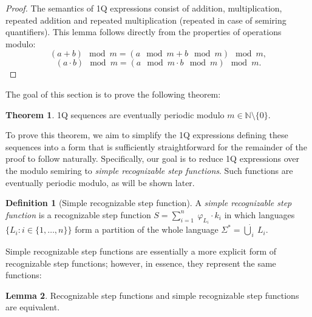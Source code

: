 \documentclass[12pt]{article}
\theoremstyle{definition}
\newtheorem{definition}{Definition}[section]
\newtheorem{theorem}{Theorem}[section]
\newtheorem{lemma}[theorem]{Lemma}
\begin{document}
\begin{proof}
    The semantics of 1Q expressions consist of addition, multiplication, repeated addition and repeated multiplication (repeated in case of semiring quantifiers). This lemma follows directly from the properties of operations modulo:
    $$(a + b) \mod m = (a \mod m + b \mod m) \mod m,$$
    $$(a \cdot b) \mod m = (a \mod m \cdot b \mod m) \mod m.$$
\end{proof}

The goal of this section is to prove the following theorem:

\begin{theorem}
    \label{1QSequencesPeriodic}
    1Q sequences are eventually periodic modulo $m \in \mathbb{N} \setminus \{0\}$.
\end{theorem}

To prove this theorem, we aim to simplify the 1Q expressions defining these sequences into a form that is sufficiently straightforward for the remainder of the proof to follow naturally. Specifically, our goal is to reduce 1Q expressions over the modulo semiring to \emph{simple recognizable step functions}. Such functions are eventually periodic modulo, as will be shown later.

\begin{definition}[Simple recognizable step function]
    \label{DefSimpleRecStepFun}
    A \textit{simple recognizable step function} is a recognizable step function $S = \sum_{i = 1}^{n} \ \varphi_{L_i} \cdot k_i$ in which languages $\{L_i : i \in \{1,\ldots,n\}\}$ form a partition of the whole language $\Sigma^* = \dot{\bigcup}_i \ L_i$.
\end{definition}

Simple recognizable step functions are essentially a more explicit form of recognizable step functions; however, in essence, they represent the same functions:

\begin{lemma}
    \label{RecEqSimpleRec}
    Recognizable step functions and simple recognizable step functions are equivalent.
\end{lemma}
\end{document}
